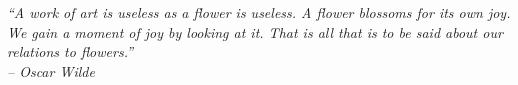 \begin{dedication}
\epigraph{\textit{
``A work of art is useless as a flower is useless.
A flower blossoms for its own joy.
We gain a moment of joy by looking at it.
That is all that is to be said about our relations to flowers.''\\
\vspace{0.5cm}
\textit{-- Oscar Wilde
}}}{}
\end{dedication}

